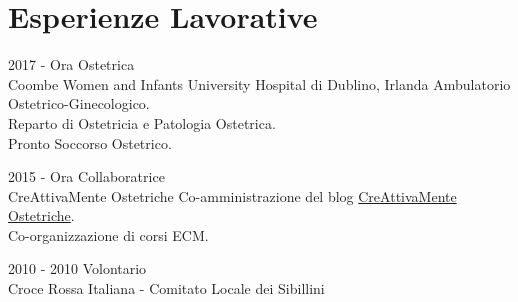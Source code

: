 \documentclass[11pt]{friggeri-cv}
\begin{document}
\vspace{-25pt}
\section{Esperienze Lavorative}
\begin{entrylist}
    \entry
  {2017 - Ora}
  {Ostetrica}
  {\\Coombe Women and Infants University Hospital di Dublino, Irlanda}
  {Ambulatorio Ostetrico-Ginecologico.\\
    Reparto di Ostetricia e Patologia Ostetrica.\\
    Pronto Soccorso Ostetrico.}
  
  \entry
  {2015 - Ora}
  {Collaboratrice}
  {\\CreAttivaMente Ostetriche}
  {Co-amministrazione del blog 
  \href{http://creattivamenteostetriche2012.blogspot.it/}{CreAttivaMente 
  Ostetriche}. \\
  Co-organizzazione di corsi ECM.}
  
  \entry
  {2010 - 2010}
  {Volontario}
  {\\Croce Rossa Italiana - Comitato Locale dei Sibillini}
  {}
\end{entrylist}
\vspace{-20pt}
\end{document}
